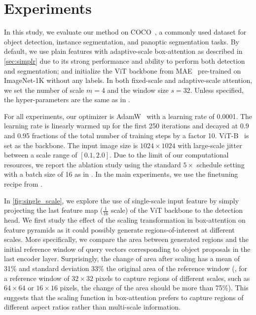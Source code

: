 
\section{Experiments}
\label{sec:experiments}

 In this study, we evaluate our method on COCO~\citep{lin2014mscoco}, a commonly used dataset for object detection, instance segmentation, and panoptic segmentation tasks. By default, we use plain features with adaptive-scale box-attention as described in \cref{sec:simplr} due to its strong performance and ability to perform both detection and segmentation; and initialize the ViT backbone from MAE~\citep{he2022mae} pre-trained on ImageNet-1K without any labels. In both fixed-scale and adaptive-scale attention, we set the number of scale $m=4$ and the window size $s=32$. Unless specified, the hyper-parameters are the same as in \cite{nguyen2022boxer}. 

For all experiments, our optimizer is AdamW~\citep{loshchilov2019adamw} with a learning rate of 0.0001. The learning rate is linearly warmed up for the first 250 iterations and decayed at 0.9 and 0.95 fractions of the total number of training steps by a factor 10. ViT-B~\citep{dosovitskiy2021vit} is set as the backbone. The input image size is $1024\times1024$ with large-scale jitter \citep{shiasi2021lsjitter} between a scale range of $[0.1, 2.0]$. Due to the limit of our computational resources, we report the ablation study using the standard $5\times$ schedule setting with a batch size of 16 as in \cite{nguyen2022boxer}. In the main experiments, we use the finetuning recipe from \cite{li2022vitdet}.

 In \cref{fig:single_scale}, we explore the use of single-scale input feature by simply projecting the last feature map ($\frac{1}{16}$ scale) of the ViT backbone to the detection head. 
We first study the effect of the scaling transformation in box-attention on feature pyramids as it could possibly generate regions-of-interest at different scales. More specifically, we compare the area between generated regions and the initial reference window of query vectors corresponding to object proposals in the last encoder layer. Surprisingly, the change of area after scaling has a mean of 31\% and standard deviation 33\% \wrt the original area of the reference window (\eg, for a reference window of $32\times32$ pixels to capture regions of different scales, such as $64\times64$ or $16\times16$ pixels, the change of the area should be more than 75\%). This suggests that the scaling function in box-attention prefers to capture regions of different aspect ratios rather than multi-scale information. 


